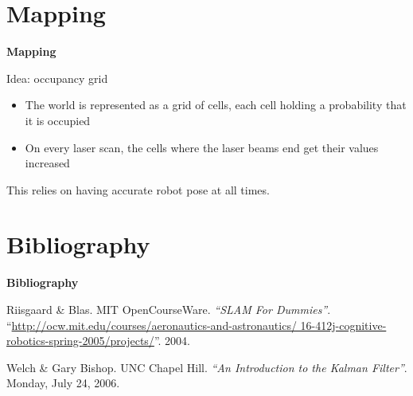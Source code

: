 \documentclass[xcolor=dvipsnames]{beamer}
\begin{document}
  \section{Mapping}
  \begin{frame}{\bf Mapping}

    Idea: occupancy grid
    \vspace{1cm}

    \begin{itemize}
    \item The world is represented as a grid of cells, each cell holding a
          probability that it is occupied
    \item On every laser scan, the cells where the laser beams end get their
          values increased
    \end{itemize}
    \vspace{1cm}

    This relies on having accurate robot pose at all times.
  \end{frame}
  
  \section{Bibliography}
  \begin{frame}{\bf Bibliography}
    \begin{thebibliography}{3}

     Riisgaard \& Blas. MIT OpenCourseWare.
      \newblock \emph{``SLAM For Dummies''}.
      \newblock
      ``\url{http://ocw.mit.edu/courses/aeronautics-and-astronautics/
        16-412j-cognitive-robotics-spring-2005/projects/}''. 2004.

       Welch \& Gary Bishop. UNC Chapel Hill. 
        \newblock \emph{``An Introduction to the Kalman Filter''}.
        Monday, July 24, 2006.

    \end{thebibliography}
  \end{frame}
  
\end{document}
